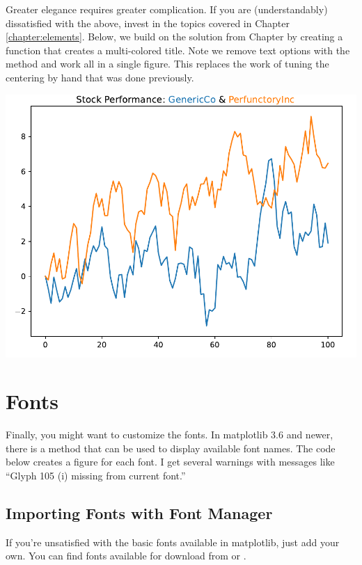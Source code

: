 Greater elegance requires greater complication. If you are (understandably) dissatisfied with the above, invest in the topics covered in Chapter \ref{chapter:elements}. 
Below, we build on the solution from Chapter  by creating a function that creates a multi-colored title. Note we remove text options with the  method and work all in a single figure. This replaces the work of tuning the centering by hand that was done previously. 



\begin{center}
    \includegraphics[width = .80\textwidth]{figures/proseplots/color-title-ex.pdf}
\end{center}

\section{Fonts}

Finally, you might want to customize the fonts. In matplotlib 3.6 and newer, there is a  method that can be used to display available font names. The code below creates a figure for each font. I get several warnings with messages like ``Glyph 105 (i) missing from current font.''




\subsection{Importing Fonts with Font Manager}
If you're unsatisfied with the basic fonts available in matplotlib, just add your own. You can find fonts available for download from  or . 

